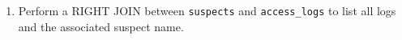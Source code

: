 \documentclass[12pt,a4paper]{article}
\begin{document}
\begin{enumerate}

    \item Perform a RIGHT JOIN between \texttt{suspects} and \texttt{access\_logs} to list all logs and the associated suspect name.







\end{enumerate}
\end{document}

